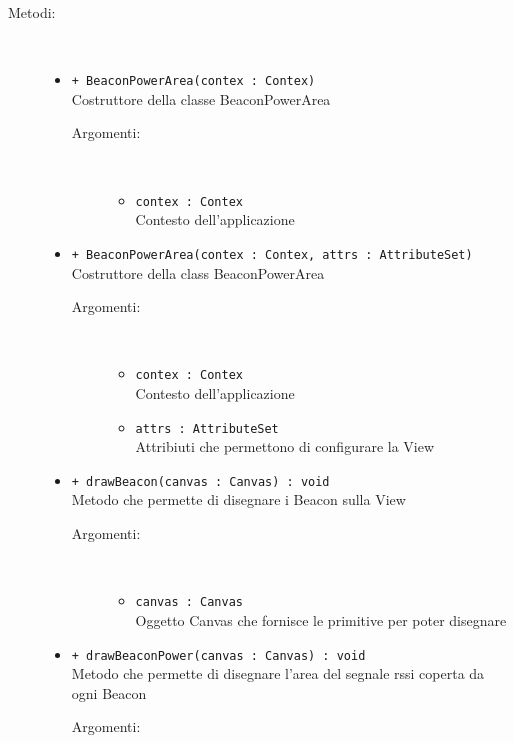 \documentclass[../DefinizioneDiProdotto.tex]{subfiles}
\begin{document}
\begin{description}
\begin{itemize}
	\end{itemize}
	\item[Metodi:] \
	\begin{itemize}
		\item \texttt{+ BeaconPowerArea(contex : Contex)}\\
		Costruttore della classe BeaconPowerArea
		\begin{description}
			\item[Argomenti:] \
			\begin{itemize}
				\item \texttt{contex : Contex}\\
				Contesto dell'applicazione\end{itemize}
		\end{description}
		\item \texttt{+ BeaconPowerArea(contex : Contex, attrs : AttributeSet)}\\
		Costruttore della class BeaconPowerArea
		\begin{description}
			\item[Argomenti:] \
			\begin{itemize}
				\item \texttt{contex : Contex}\\
				Contesto dell'applicazione\item \texttt{attrs : AttributeSet}\\
				Attribiuti che permettono di configurare la View\end{itemize}
		\end{description}
		\item \texttt{+ drawBeacon(canvas : Canvas) : void}\\
		Metodo che permette di disegnare i Beacon sulla View
		\begin{description}
			\item[Argomenti:] \
			\begin{itemize}
				\item \texttt{canvas : Canvas}\\
				Oggetto Canvas che fornisce le primitive per poter disegnare\end{itemize}
		\end{description}
		\item \texttt{+ drawBeaconPower(canvas : Canvas) : void}\\
		Metodo che permette di disegnare l'area del segnale rssi coperta da ogni Beacon
		\begin{description}
			\item[Argomenti:] \

\end{description}
\end{itemize}
\end{description}
\end{document}
